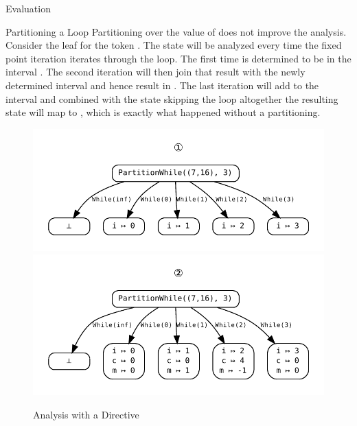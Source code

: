 \begin{chapter}{Evaluation}
\begin{section}{Partitioning a Loop}
		Partitioning over the value of  does not improve the analysis. Consider the leaf for the token . The state will be analyzed every time the fixed point iteration iterates through the loop. The first time  is determined to be in the interval \code{[1,1]}. The second iteration will then join that result with the newly determined interval \code{[2,2]} and hence result in \code{[1,2]}. The last iteration will add  to the interval and combined with the state skipping the loop altogether the resulting state will map  to \code{[0,3]}, which is exactly what happened without a partitioning.

		\begin{figure}
			\centering
			\includegraphics[]{Graphs/PartitionWhileExample1}
			\includegraphics[]{Graphs/PartitionWhileExample2}
			\caption{Analysis with a  Directive}
			\label{figure:PartitionWhileExample}
		\end{figure}


\end{section}
\end{chapter}
